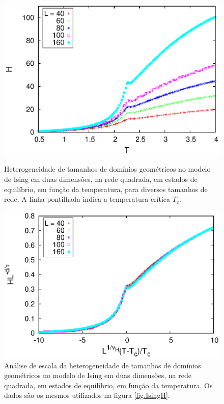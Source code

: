 \begin{figure}
 \centering
 \includegraphics[width=14cm]{fig/hetequi_q2.eps}
 \caption{Heterogeneidade de tamanhos de domínios geométricos no modelo de Ising em duas dimensões, na rede quadrada, em estados de equilíbrio, em função da temperatura, para diversos tamanhos de rede. A linha pontilhada indica a temperatura crítica $T_c$.}
\label{fig.IsingH}
\vspace{8mm}
 \includegraphics[width=14cm]{fig/hetequi_q2_colXY.eps}
 \caption{Análise de escala da heterogeneidade de tamanhos de domínios geométricos no modelo de Ising em duas dimensões, na rede quadrada, em estados de equilíbrio, em função da temperatura. Os dados são os mesmos utilizados na figura \ref{fig.IsingH}.}
\label{fig.IsingHCol}
\end{figure}

